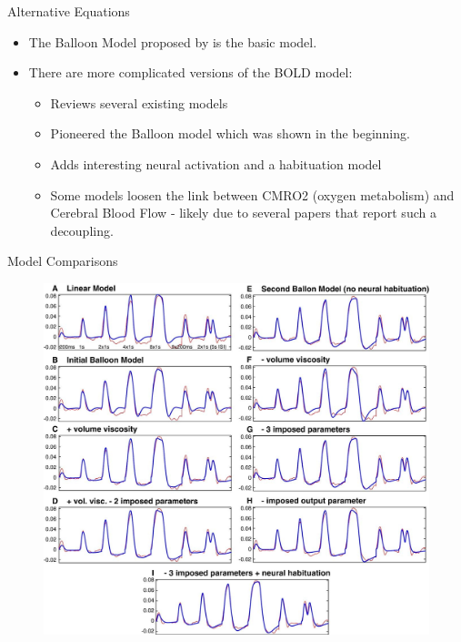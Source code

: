 \documentclass{beamer}
\begin{document}
\begin{frame}{Alternative Equations}
\begin{itemize}
    \item The Balloon Model proposed by \cite{ISI:000073759600002} is the basic model.
    \item There are more complicated versions of the BOLD model:
    \begin{itemize}
        \item \cite{ISI:000240969200015} Reviews several existing models
        \item \cite{Buxton2004S220} Pioneered the Balloon model which was shown in the beginning.
        \item \cite{ISI:000234015300018} Adds interesting neural activation and a habituation model
        \item Some models loosen the link between CMRO2 (oxygen metabolism)
            and Cerebral Blood Flow - likely due to several papers that report
            such a decoupling.
    \end{itemize}
\end{itemize}
\end{frame}

\begin{frame}{Model Comparisons}
\begin{figure}
\includegraphics[scale=.165]{demeux}
\end{figure}
\end{frame}
\end{document}
